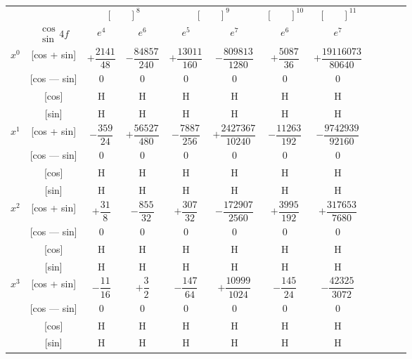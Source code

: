 \documentclass[11pt,a4paper]{book}
\begin{document}
\vspace{1em}


\begin{center}
\small
\begin{tabular}{|c|c|c|c|c|c|c|c|c|c|c|c|}
\hline
& & \multicolumn{2}{c|}{$[\phantom{()}]^8$} & \multicolumn{2}{c|}{$[\phantom{()}]^9$} & \multicolumn{1}{c|}{$[\phantom{()}]^{10}$} & \multicolumn{1}{c|}{$[\phantom{()}]^{11}$} \\
\cline{3-8}
& $\begin{smallmatrix} \cos \\ \sin \end{smallmatrix} 4f$ & $e^4$ & $e^6$ & $e^5$ & $e^7$ & $e^6$ & $e^7$ \\
\hline
\multirow{4}{*}{$x^0$} & [cos + sin] & $+\dfrac{2141}{48}$ & $-\dfrac{84857}{240}$ & $+\dfrac{13011}{160}$ & $-\dfrac{809813}{1280}$ & $+\dfrac{5087}{36}$ & $+\dfrac{19116073}{80640}$ \\
& [cos --- sin] & $0$ & $0$ & $0$ & $0$ & $0$ & $0$ \\
& [cos] & H & H & H & H & H & H \\
& [sin] & H & H & H & H & H & H \\
\hline
\multirow{4}{*}{$x^1$} & [cos + sin] & $-\dfrac{359}{24}$ & $+\dfrac{56527}{480}$ & $-\dfrac{7887}{256}$ & $+\dfrac{2427367}{10240}$ & $-\dfrac{11263}{192}$ & $-\dfrac{9742939}{92160}$ \\
& [cos --- sin] & $0$ & $0$ & $0$ & $0$ & $0$ & $0$ \\
& [cos] & H & H & H & H & H & H \\
& [sin] & H & H & H & H & H & H \\
\hline
\multirow{4}{*}{$x^2$} & [cos + sin] & $+\dfrac{31}{8}$ & $-\dfrac{855}{32}$ & $+\dfrac{307}{32}$ & $-\dfrac{172907}{2560}$ & $+\dfrac{3995}{192}$ & $+\dfrac{317653}{7680}$ \\
& [cos --- sin] & $0$ & $0$ & $0$ & $0$ & $0$ & $0$ \\
& [cos] & H & H & H & H & H & H \\
& [sin] & H & H & H & H & H & H \\
\hline
\multirow{4}{*}{$x^3$} & [cos + sin] & $-\dfrac{11}{16}$ & $+\dfrac{3}{2}$ & $-\dfrac{147}{64}$ & $+\dfrac{10999}{1024}$ & $-\dfrac{145}{24}$ & $-\dfrac{42325}{3072}$ \\
& [cos --- sin] & $0$ & $0$ & $0$ & $0$ & $0$ & $0$ \\
& [cos] & H & H & H & H & H & H \\
& [sin] & H & H & H & H & H & H \\
\hline
\end{tabular}
\end{center}
\end{document}
